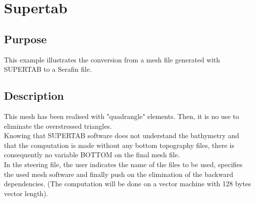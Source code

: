 \chapter{Supertab}
%
%
\section{Purpose}
This example illustrates the conversion from a mesh file generated with
SUPERTAB to a Serafin file.
%
\section{Description}
This mesh has been realised with "quadrangle" elements. Then, it is no use to
eliminate the overstressed triangles.\\
Knowing that SUPERTAB software does not understand the bathymetry and that the \stbtel
computation is made without any bottom topography files, there is consequently no variable
BOTTOM on the final mesh file.\\
In the steering file, the user indicates the name of the files to be used, specifies the used
mesh software and finally push on the elimination of the backward dependencies. (The
 computation will be done on a vector machine with 128 bytes vector length).

